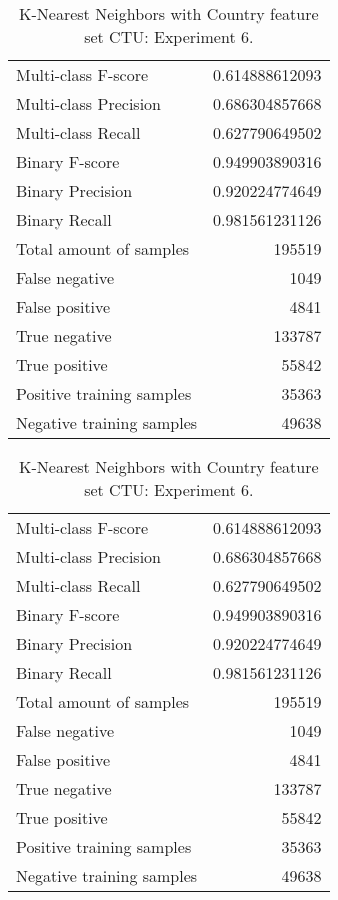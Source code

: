\begin{table}[H]
\begin{minipage}{0.5\textwidth}
\caption{K-Nearest Neighbors with Country feature set CTU: Experiment 5.}
\centering
\begin{tabular}{l r}
\toprule
Multi-class F-score & 0.614888612093 \\
Multi-class Precision & 0.686304857668 \\
Multi-class Recall & 0.627790649502 \\
\midrule
Binary F-score & 0.949903890316 \\
Binary Precision & 0.920224774649 \\
Binary Recall & 0.981561231126 \\
\midrule
Total amount of samples & 195519 \\
False negative & 1049 \\
False positive & 4841 \\
True negative & 133787 \\
True positive & 55842 \\
\midrule
Positive training samples & 35363 \\
Negative training samples & 49638 \\
\bottomrule
\end{tabular}
\end{minipage}
\hfillx
\begin{minipage}{0.5\textwidth}
\caption{K-Nearest Neighbors with Country feature set CTU: Experiment 6.}
\centering
\begin{tabular}{l r}
\toprule
Multi-class F-score & 0.614888612093 \\
Multi-class Precision & 0.686304857668 \\
Multi-class Recall & 0.627790649502 \\
\midrule
Binary F-score & 0.949903890316 \\
Binary Precision & 0.920224774649 \\
Binary Recall & 0.981561231126 \\
\midrule
Total amount of samples & 195519 \\
False negative & 1049 \\
False positive & 4841 \\
True negative & 133787 \\
True positive & 55842 \\
\midrule
Positive training samples & 35363 \\
Negative training samples & 49638 \\
\bottomrule
\end{tabular}
\end{minipage}
\end{table}
